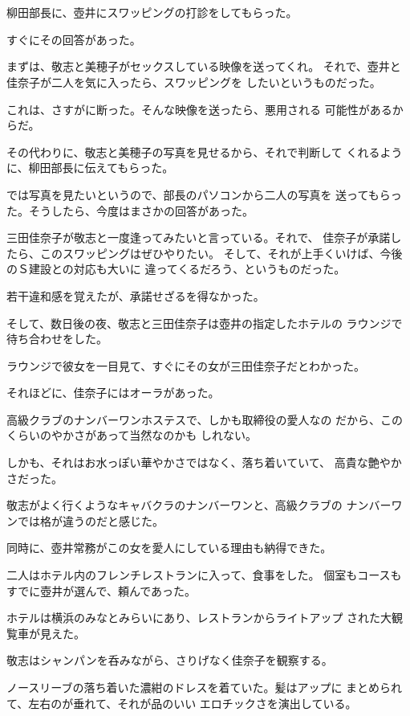 ﻿\documentclass[
    book,tate,
    line_length=30zw,
    jafontsize=12pt,
    paper=b5j,
    landscape,
    ]{jlreq}
\begin{document}
\section*{}

柳田部長に、壺井にスワッピングの打診をしてもらった。

すぐにその回答があった。

まずは、敬志と美穂子がセックスしている映像を送ってくれ。
それで、壺井と佳奈子が二人を気に入ったら、スワッピングを
したいというものだった。

これは、さすがに断った。そんな映像を送ったら、悪用される
可能性があるからだ。

その代わりに、敬志と美穂子の写真を見せるから、それで判断して
くれるように、柳田部長に伝えてもらった。

では写真を見たいというので、部長のパソコンから二人の写真を
送ってもらった。そうしたら、今度はまさかの回答があった。

三田佳奈子が敬志と一度逢ってみたいと言っている。それで、
佳奈子が承諾したら、このスワッピングはぜひやりたい。
そして、それが上手くいけば、今後のＳ建設との対応も大いに
違ってくるだろう、というものだった。

若干違和感を覚えたが、承諾せざるを得なかった。

そして、数日後の夜、敬志と三田佳奈子は壺井の指定したホテルの
ラウンジで待ち合わせをした。

ラウンジで彼女を一目見て、すぐにその女が三田佳奈子だとわかった。

それほどに、佳奈子にはオーラがあった。

高級クラブのナンバーワンホステスで、しかも取締役の愛人なの
だから、このくらいのやかさがあって当然なのかも
しれない。

しかも、それはお水っぽい華やかさではなく、落ち着いていて、
高貴な艶やかさだった。

敬志がよく行くようなキャバクラのナンバーワンと、高級クラブの
ナンバーワンでは格が違うのだと感じた。

同時に、壺井常務がこの女を愛人にしている理由も納得できた。

二人はホテル内のフレンチレストランに入って、食事をした。
個室もコースもすでに壺井が選んで、頼んであった。

ホテルは横浜のみなとみらいにあり、レストランからライトアップ
された大観覧車が見えた。

敬志はシャンパンを呑みながら、さりげなく佳奈子を観察する。

ノースリーブの落ち着いた濃紺のドレスを着ていた。髪はアップに
まとめられて、左右のが垂れて、それが品のいい
エロチックさを演出している。
\end{document}
